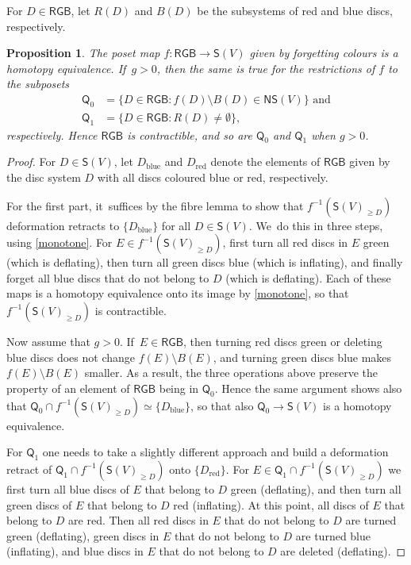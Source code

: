 \documentclass[JEP,XML,SOM,Unicode,NoFloatCountersInSection,published]{cedram}
\theoremstyle{plain}
\newtheorem{prop}[thm]{Proposition}
\theoremstyle{definition}
\newcommand{\RGB}{{\mathsf{RGB}}}
\newcommand{\NS}{\mathsf{NS}}
\newcommand{\SD}{\mathsf{S}}
\begin{document}
For $D \in \RGB$, let $R(D)$ and $B(D)$ be the subsystems of red and blue discs, respectively.

\begin{prop}\label{p:colour_forgetting_maps}
The poset map $f: \RGB \to \SD(V)$ given by forgetting colours is a homotopy equivalence. If~$g>0$, then the same is true for the restrictions of $f$ to the subposets
\begin{align*}
{\mathsf Q_0} &= \{D \in \RGB : f(D) \setminus B(D) \in \NS(V) \} \text{ and} \\
{\mathsf Q_1} &= \{D \in \RGB : R(D) \neq \emptyset \},
\end{align*}
respectively. Hence $\RGB$ is contractible, and so are $\mathsf Q_0$ and $\mathsf Q_1$ when $g>0$.
\end{prop}

\begin{proof}For $D \in \SD(V)$, let $D_{\mathrm{blue}}$ and $D_{\mathrm{red}}$ denote the elements of $\RGB$ given by the disc system $D$ with all discs coloured blue or red, respectively.

For the first part, it~suffices by the fibre lemma to show that $f^{-1}(\SD(V)_{\geq D})$ deformation retracts to $\{D_{\mathrm{blue}}\}$ for all $D \in \SD(V)$. We~do this in three steps, using \cref{monotone}. For $E \in f^{-1}(\SD(V)_{\geq D})$, first turn all red discs in $E$ green (which is deflating), then turn all green discs blue (which is inflating), and finally forget all blue discs that do not belong to $D$ (which is deflating). Each of these maps is a homotopy equivalence onto its image by \cref{monotone}, so that $f^{-1}(\SD(V)_{\geq D})$ is contractible.

Now assume that $g>0$. If~$E \in \RGB$, then turning red discs green or deleting blue discs does not change $f(E) \setminus B(E)$, and turning green discs blue makes $f(E) \setminus B(E)$ smaller. As a result, the three operations above preserve the property of an element of $\RGB$ being in $\mathsf Q_0$. Hence the same argument shows also that $\mathsf Q_0 \cap f^{-1}(\SD(V)_{\geq D}) \simeq \{D_{\mathrm{blue}}\}$, so that also $\mathsf Q_0 \to \SD(V)$ is a homotopy equivalence.

For $\mathsf Q_1$ one needs to take a slightly different approach and build a deformation retract of $\mathsf Q_1 \cap f^{-1}(\SD(V)_{\geq D})$ onto $\{D_{\mathrm{red}}\}$. For $E \in \mathsf Q_1 \cap f^{-1}(\SD(V)_{\geq D})$ we first turn all blue discs of $E$ that belong to $ D$ green (deflating), and then turn all green discs of $E$ that belong to $ D$ red (inflating). At this point, all discs of $E$ that belong to $D$ are red. Then all red discs in $E$ that do not belong to $D$ are turned green (deflating), green discs in $E$ that do not belong to $D$ are turned blue (inflating), and blue discs in $E$ that do not belong to $D$ are deleted (deflating). \end{proof}
\end{document}

